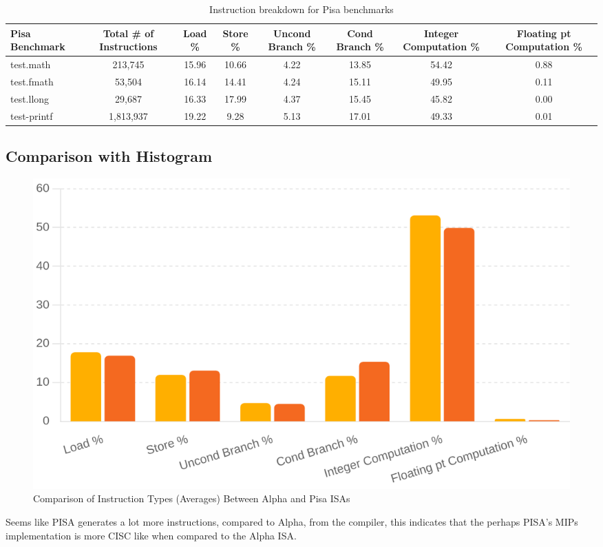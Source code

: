 \documentclass{article}
\begin{document}
\begin{table}[ht]
	\centering
	\begin{adjustbox}{max width=\textwidth}
		\begin{tabular}{|l|c|c|c|c|c|c|c|}
			\hline
			\textbf{Pisa Benchmark}      & \textbf{Total \# of Instructions} & \textbf{Load \%} & \textbf{Store \%} & \textbf{Uncond Branch \%} & \textbf{Cond Branch \%} & \textbf{Integer Computation \%} & \textbf{Floating pt Computation \%} \\ \hline
			test.math          &213,745&15.96&10.66&4.22&13.85&54.42&0.88 \\ \hline
			test.fmath                &53,504&16.14&14.41&4.24&15.11&49.95&0.11 \\ \hline
			test.llong          &29,687&16.33& 17.99&4.37&15.45&45.82&0.00      \\ \hline
			test-printf               &1,813,937&19.22&9.28&5.13&17.01&49.33&0.01 \\ \hline
		\end{tabular}
	\end{adjustbox}
	\caption{Instruction breakdown for Pisa benchmarks}
\end{table}
\subsection{Comparison with Histogram}
\begin{figure}[H]
	\centering
	\includegraphics[scale=0.3]{Comparison of Instruction Types Between Alpha and Pisa ISAs.png}
	\caption{Comparison of Instruction Types (Averages) Between Alpha and Pisa ISAs}
	\label{fig:memory_bandwidth}
\end{figure}
Seems like PISA generates a lot more instructions, compared to Alpha, from the compiler, this indicates that the perhaps PISA's MIPs implementation is more CISC like when compared to the Alpha ISA. 
\end{document}

